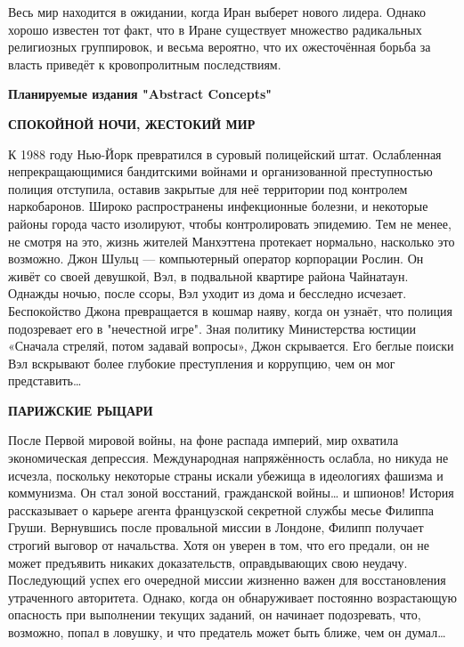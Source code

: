 \documentclass[a5paper, 9pt,
final, openany, twoside=true]{memoir}
\begin{document}
Весь мир находится в ожидании, когда Иран выберет нового лидера. Однако хорошо известен тот факт, что в Иране существует множество радикальных религиозных группировок, и весьма вероятно, что их ожесточённая борьба за власть приведёт к кровопролитным последствиям.

\newpage


\vspace*{3\baselineskip}

\noindent
{\sffamily\bfseries\Large
    Планируемые издания "Abstract Concepts"\bigskip
}
\newline\newline

\noindent
{\sffamily\bfseries\Large
    СПОКОЙНОЙ НОЧИ, ЖЕСТОКИЙ МИР\bigskip
}

\noindent
К 1988 году Нью-Йорк превратился в суровый полицейский штат. Ослабленная непрекращающимися бандитскими войнами и организованной преступностью полиция отступила, оставив закрытые для неё территории под контролем наркобаронов. Широко распространены инфекционные болезни, и некоторые районы города часто изолируют, чтобы контролировать эпидемию. Тем не менее, не смотря на это, жизнь жителей Манхэттена протекает нормально, насколько это возможно.
Джон Шульц — компьютерный оператор корпорации Рослин. Он живёт со своей девушкой, Вэл, в подвальной квартире района Чайнатаун.
Однажды ночью, после ссоры, Вэл уходит из дома и бесследно исчезает. Беспокойство Джона превращается в кошмар наяву, когда он узнаёт, что полиция подозревает его в "нечестной игре". Зная политику Министерства юстиции «Сначала стреляй, потом задавай вопросы», Джон скрывается.
Его беглые поиски Вэл вскрывают более глубокие преступления и коррупцию, чем он мог представить…
\newline\newline

\noindent
{\sffamily\bfseries\Large
    ПАРИЖСКИЕ РЫЦАРИ\bigskip
}

\noindent
После Первой мировой войны, на фоне распада империй, мир охватила экономическая депрессия. Международная напряжённость ослабла, но никуда не исчезла, поскольку некоторые страны искали убежища в идеологиях фашизма и коммунизма.
Он стал зоной восстаний, гражданской войны… и шпионов!
История рассказывает о карьере агента французской секретной службы месье Филиппа Груши. Вернувшись после провальной миссии в Лондоне, Филипп получает строгий выговор от начальства. Хотя он уверен в том, что его предали, он не может предъявить никаких доказательств, оправдывающих свою неудачу. Последующий успех его очередной миссии жизненно важен для восстановления утраченного авторитета. Однако, когда он обнаруживает постоянно возрастающую опасность при выполнении текущих заданий, он начинает подозревать, что, возможно, попал в ловушку, и что предатель может быть ближе, чем он думал…
\end{document}
